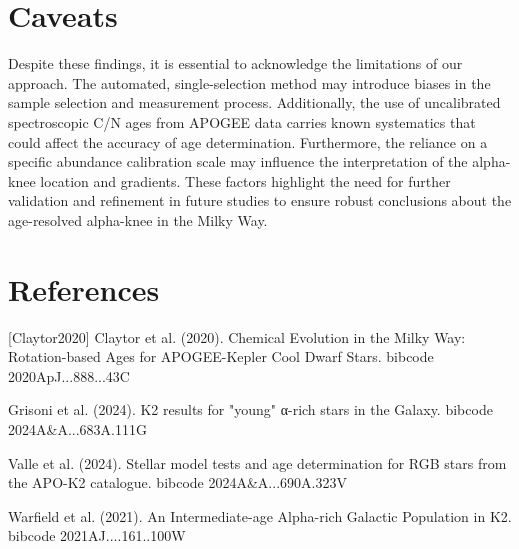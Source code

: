 \documentclass[twocolumn]{aastex631}
\begin{document}
\section{Caveats}
Despite these findings, it is essential to acknowledge the limitations of our approach. The automated, single-selection method may introduce biases in the sample selection and measurement process. Additionally, the use of uncalibrated spectroscopic C/N ages from APOGEE data carries known systematics that could affect the accuracy of age determination. Furthermore, the reliance on a specific abundance calibration scale may influence the interpretation of the alpha-knee location and gradients. These factors highlight the need for further validation and refinement in future studies to ensure robust conclusions about the age-resolved alpha-knee in the Milky Way.
\section*{References}
\footnotesize
[Claytor2020] Claytor et al. (2020). Chemical Evolution in the Milky Way: Rotation-based Ages for APOGEE-Kepler Cool Dwarf Stars. bibcode 2020ApJ...888...43C \par [Grisoni2024] Grisoni et al. (2024). K2 results for "young" α-rich stars in the Galaxy. bibcode 2024A\&A...683A.111G \par [Valle2024] Valle et al. (2024). Stellar model tests and age determination for RGB stars from the APO-K2 catalogue. bibcode 2024A\&A...690A.323V \par [Warfield2021] Warfield et al. (2021). An Intermediate-age Alpha-rich Galactic Population in K2. bibcode 2021AJ....161..100W
\end{document}
